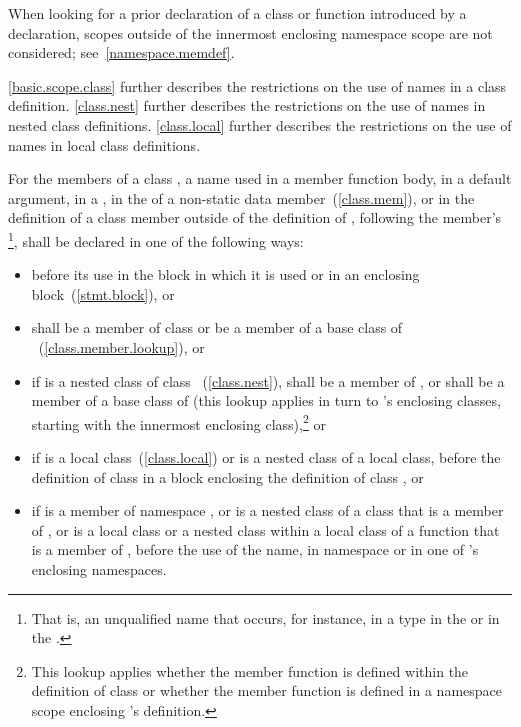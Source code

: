 \begin{note}
When looking for a prior declaration of a class
or function introduced by a  declaration, scopes outside
of the innermost enclosing namespace scope are not considered;
see~\ref{namespace.memdef}. \end{note} \begin{note} \ref{basic.scope.class}
further describes the restrictions on the use of names in a class
definition. \ref{class.nest} further describes the restrictions on the
use of names in nested class definitions. \ref{class.local} further
describes the restrictions on the use of names in local class
definitions.
\end{note}

\pnum
For the members of a class , a name used in a member function
body, in a default argument, in a , in the
 of a non-static data
member~(\ref{class.mem}), or in the definition of a class member
outside of the definition of , following the
member's
\footnote{That is, an unqualified name that occurs,
for instance, in a
type in the
 or in the
.}, shall be declared in one of the
following ways:
\begin{itemize}
\item before its use in the block in which it is used or in an enclosing
block~(\ref{stmt.block}), or

\item shall be a member of class  or be a member of a base
class of ~(\ref{class.member.lookup}), or

\item if 
is a nested class of class ~(\ref{class.nest}), shall be a
member of , or shall be a member of a base class of 
(this lookup applies in turn to 's enclosing classes, starting
with the innermost enclosing class),\footnote{This lookup applies whether
the member function is defined
within the definition of class  or whether the member function
is defined in a namespace scope enclosing 's definition.}
or

\item if  is a local class~(\ref{class.local}) or is a nested
class of a local class, before the definition of class  in a
block enclosing the definition of class , or

\item if  is a member of namespace , or is a nested
class of a class that is a member of , or is a local class or a
nested class within a local class of a function that is a member of
, before the use of the name, in namespace 
or in one of 's enclosing namespaces.
\end{itemize}
